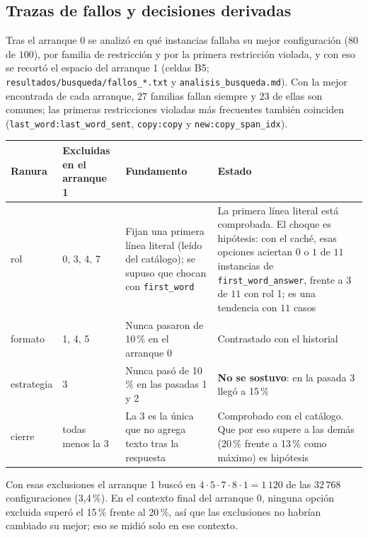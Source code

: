 \subsection{Trazas de fallos y decisiones derivadas}

Tras el arranque 0 se analizó en qué instancias fallaba su mejor configuración
($80$ de $100$), por familia de restricción y por la primera restricción violada, y con eso
se recortó el espacio del arranque 1 (celdas B5; \texttt{resultados/busqueda/fallos\_*.txt}
y \texttt{analisis\_busqueda.md}). Con la mejor encontrada de cada arranque, $27$ familias
fallan siempre y $23$ de ellas son comunes; las primeras restricciones violadas más
frecuentes también coinciden (\texttt{last\_word:last\_word\_sent}, \texttt{copy:copy} y
\texttt{new:copy\_span\_idx}).

\begin{center}
\begin{tabular}{p{}p{}p{}p{}}
\toprule
Ranura & Excluidas en el arranque 1 & Fundamento & Estado \\
\midrule
rol & 0, 3, 4, 7 & Fijan una primera línea literal (leído del catálogo); se supuso que chocan con \texttt{first\_word} & La primera línea literal está comprobada. El choque es hipótesis: con el caché, esas opciones aciertan $0$ o $1$ de $11$ instancias de \texttt{first\_word\_answer}, frente a $3$ de $11$ con rol 1; es una tendencia con $11$ casos \\
formato & 1, 4, 5 & Nunca pasaron de 10\,\% en el arranque 0 & Contrastado con el historial \\
estrategia & 3 & Nunca pasó de 10\,\% en las pasadas 1 y 2 & \textbf{No se sostuvo}: en la pasada 3 llegó a 15\,\% \\
cierre & todas menos la 3 & La 3 es la única que no agrega texto tras la respuesta & Comprobado con el catálogo. Que por eso supere a las demás (20\,\% frente a 13\,\% como máximo) es hipótesis \\
\bottomrule
\end{tabular}
\end{center}

Con esas exclusiones el arranque 1 buscó en $4\cdot5\cdot7\cdot8\cdot1=1\,120$ de las
$32\,768$ configuraciones (3{,}4\,\%). En el contexto final del arranque 0, ninguna opción
excluida superó el 15\,\% frente al 20\,\%, así que las exclusiones no habrían cambiado
su mejor; eso se midió solo en ese contexto.

